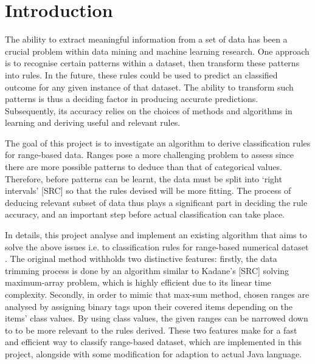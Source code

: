 \chapter{Introduction}

The ability to extract meaningful information from a set of data has been a crucial problem within data mining and machine learning research. One approach is to recognise certain patterns within a dataset, then transform these patterns into rules. In the future, these rules could be used to predict an classified outcome for any given instance of that dataset. The ability to transform such patterns is thus a deciding factor in producing accurate predictions. Subsequently, its accuracy relies on the choices of methods and algorithms in learning and deriving useful and relevant rules. 

The goal of this project is to investigate an algorithm to derive classification rules for range-based data. Ranges pose a more challenging problem to assess since there are more possible patterns to deduce than that of categorical values. Therefore, before patterns can be learnt, the data must be split into `right intervals' [SRC] so that the rules devised will be more fitting. The process of deducing relevant subset of data thus plays a significant part in deciding the rule accuracy, and an important step before actual classification can take place. 


In details, this project analyse and implement an existing algorithm that aims to solve the above issues i.e. to classification rules for range-based numerical dataset \cite{tziatzios_shao_loukides_2011}. The original method withholds two distinctive features: firstly, the data trimming process is done by an algorithm similar to Kadane's [SRC] solving maximum-array problem, which is highly efficient due to its linear time complexity. Secondly, in order to mimic that max-sum method, chosen ranges are analysed by assigning binary tags upon their covered items depending on the items' class values. By using class values, the given ranges can be narrowed down to to be more relevant to the rules derived. These two features make for a fast and efficient way to classify range-based dataset, which are implemented in this project, alongside with some modification for adaption to actual Java language.





